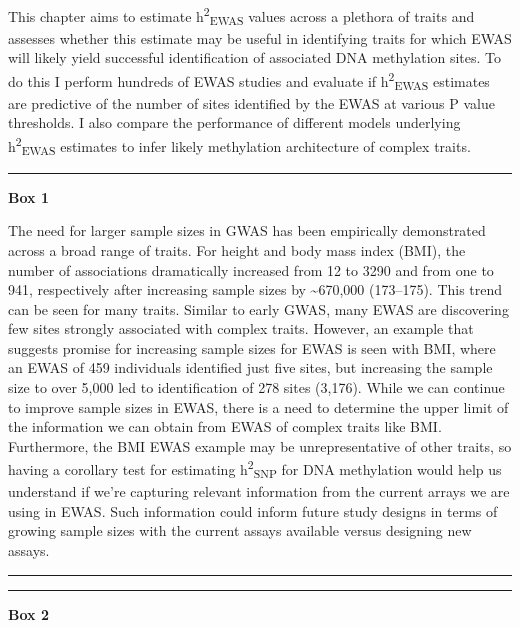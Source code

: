 \documentclass[11pt,oneside]{bristolthesis}
\begin{document}
This chapter aims to estimate h\textsuperscript{2}\textsubscript{EWAS} values across a plethora of traits and assesses whether this estimate may be useful in identifying traits for which EWAS will likely yield successful identification of associated DNA methylation sites. To do this I perform hundreds of EWAS studies and evaluate if h\textsuperscript{2}\textsubscript{EWAS} estimates are predictive of the number of sites identified by the EWAS at various P value thresholds. I also compare the performance of different models underlying h\textsuperscript{2}\textsubscript{EWAS} estimates to infer likely methylation architecture of complex traits.
\begin{center}\rule{0.5\linewidth}{0.5pt}\end{center}

\textbf{Box 1}

The need for larger sample sizes in GWAS has been empirically demonstrated across a broad range of traits. For height and body mass index (BMI), the number of associations dramatically increased from 12 to 3290 and from one to 941, respectively after increasing sample sizes by \textasciitilde670,000 (173--175). This trend can be seen for many traits. Similar to early GWAS, many EWAS are discovering few sites strongly associated with complex traits. However, an example that suggests promise for increasing sample sizes for EWAS is seen with BMI, where an EWAS of 459 individuals identified just five sites, but increasing the sample size to over 5,000 led to identification of 278 sites (3,176). While we can continue to improve sample sizes in EWAS, there is a need to determine the upper limit of the information we can obtain from EWAS of complex traits like BMI. Furthermore, the BMI EWAS example may be unrepresentative of other traits, so having a corollary test for estimating h\textsuperscript{2}\textsubscript{SNP} for DNA methylation would help us understand if we're capturing relevant information from the current arrays we are using in EWAS. Such information could inform future study designs in terms of growing sample sizes with the current assays available versus designing new assays.
\begin{center}\rule{0.5\linewidth}{0.5pt}\end{center}
\begin{center}\rule{0.5\linewidth}{0.5pt}\end{center}

\textbf{Box 2}
\end{document}
